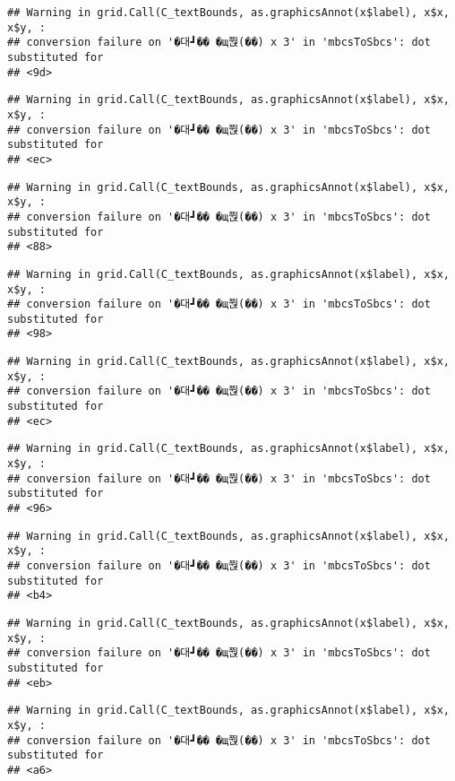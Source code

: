 \documentclass[
]{article}
\begin{document}
\begin{verbatim}
## Warning in grid.Call(C_textBounds, as.graphicsAnnot(x$label), x$x, x$y, :
## conversion failure on '�대┛�� �щ쭩(��) x 3' in 'mbcsToSbcs': dot substituted for
## <9d>
\end{verbatim}

\begin{verbatim}
## Warning in grid.Call(C_textBounds, as.graphicsAnnot(x$label), x$x, x$y, :
## conversion failure on '�대┛�� �щ쭩(��) x 3' in 'mbcsToSbcs': dot substituted for
## <ec>
\end{verbatim}

\begin{verbatim}
## Warning in grid.Call(C_textBounds, as.graphicsAnnot(x$label), x$x, x$y, :
## conversion failure on '�대┛�� �щ쭩(��) x 3' in 'mbcsToSbcs': dot substituted for
## <88>
\end{verbatim}

\begin{verbatim}
## Warning in grid.Call(C_textBounds, as.graphicsAnnot(x$label), x$x, x$y, :
## conversion failure on '�대┛�� �щ쭩(��) x 3' in 'mbcsToSbcs': dot substituted for
## <98>
\end{verbatim}

\begin{verbatim}
## Warning in grid.Call(C_textBounds, as.graphicsAnnot(x$label), x$x, x$y, :
## conversion failure on '�대┛�� �щ쭩(��) x 3' in 'mbcsToSbcs': dot substituted for
## <ec>
\end{verbatim}

\begin{verbatim}
## Warning in grid.Call(C_textBounds, as.graphicsAnnot(x$label), x$x, x$y, :
## conversion failure on '�대┛�� �щ쭩(��) x 3' in 'mbcsToSbcs': dot substituted for
## <96>
\end{verbatim}

\begin{verbatim}
## Warning in grid.Call(C_textBounds, as.graphicsAnnot(x$label), x$x, x$y, :
## conversion failure on '�대┛�� �щ쭩(��) x 3' in 'mbcsToSbcs': dot substituted for
## <b4>
\end{verbatim}

\begin{verbatim}
## Warning in grid.Call(C_textBounds, as.graphicsAnnot(x$label), x$x, x$y, :
## conversion failure on '�대┛�� �щ쭩(��) x 3' in 'mbcsToSbcs': dot substituted for
## <eb>
\end{verbatim}

\begin{verbatim}
## Warning in grid.Call(C_textBounds, as.graphicsAnnot(x$label), x$x, x$y, :
## conversion failure on '�대┛�� �щ쭩(��) x 3' in 'mbcsToSbcs': dot substituted for
## <a6>
\end{verbatim}
\end{document}

